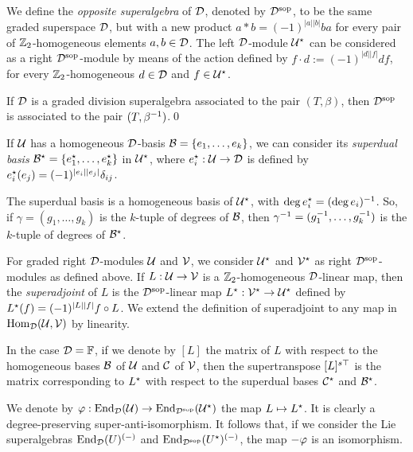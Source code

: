 \documentclass{amsbook}
\begin{document}
We define the \emph{opposite superalgebra} of $\mathcal{D}$, denoted by $\mathcal{D}^{\mathrm{sop}}$, to be the same graded superspace $\mathcal{D}$, but with a new product $a*b = (-1)^{|a||b|} ba$ for every pair of $\mathbb{Z}_2$-homogeneous elements $a,b \in \mathcal{D}$. The left $\mathcal{D}$-module $\mathcal U^\star$ can be considered as a right $\mathcal{D}^{\mathrm{sop}}$-module by means of the action defined by $f\cdot d := (-1)^{|d||f|} df$, for every $\mathbb{Z}_2$-homogeneous $d\in \mathcal{D}$ and $f\in \mathcal U^\star$.

\begin{lemma}\label{lemma:Dsop}
	If $\mathcal{D}$ is a graded division superalgebra associated to the pair $(T,\beta)$, then $\mathcal{D}^{\mathrm{sop}}$ is associated to the pair $(T,\beta^{-1})$.\qed
\end{lemma}

If $\mathcal U$ has a homogeneous $\mathcal{D}$-basis $\mathcal B = \{e_1, \ldots, e_k\}$, we can consider its \emph{superdual basis} $\mathcal B^\star = \{e_1^\star, \ldots, e_k^\star\}$ in $\mathcal U^\star$, where $e_i^\star : \mathcal U \rightarrow \mathcal{D}$ is defined by $e_i^\star (e_j) = (-1)^{|e_i||e_j|} \delta_{ij}$.

\begin{remark}\label{rmk:gamma-inv}
	The superdual basis is a homogeneous basis of $\mathcal U^\star$, with $\deg e_i^\star = (\deg e_i)^{-1}$. So, if $\gamma = (g_1, \ldots, g_k)$ is the $k$-tuple of degrees of $\mathcal B$, then $\gamma^{-1} = (g_1^{-1}, \ldots, g_k^{-1})$ is the $k$-tuple of degrees of $\mathcal B^\star$.
\end{remark}

For graded right $\mathcal{D}$-modules $\mathcal U$ and $\mathcal V$, we consider $\mathcal U^\star$ and $\mathcal V^\star$ as right $\mathcal{D}^{\mathrm{sop}}$-modules as defined above. If $L:\mathcal U \rightarrow \mathcal V$ is a $\mathbb{Z}_2$-homogeneous $\mathcal{D}$-linear map, then the \emph{superadjoint} of $L$ is the $\mathcal{D}^{\mathrm{sop}}$-linear map $L^\star: \mathcal V^\star \rightarrow \mathcal U^\star$ defined by $L^\star (f) = (-1)^{|L||f|} f \circ L$. We extend the definition of superadjoint to any map in $\operatorname{Hom}_{\mathcal{D}} (\mathcal U, \mathcal V)$ by linearity.

\begin{remark}
	In the case $\mathcal{D}=\mathbb{F}$, if we denote by $[L]$ the matrix of $L$ with respect to the homogeneous bases $\mathcal B$ of $\mathcal U$ and $\mathcal C$ of $\mathcal V$, then the supertranspose $[L]^{s\top}$ is the matrix corresponding to $L^\star$ with respect to the superdual bases $\mathcal C^\star$ and $\mathcal B^\star$.
\end{remark}

We denote by $\varphi: \operatorname{End}_{\mathcal{D}} (\mathcal U) \rightarrow \operatorname{End}_{\mathcal{D}^{\mathrm{sop}}} (\mathcal U^\star)$ the map $L \mapsto L^\star$. It is clearly a degree-preserving super-anti-isomorphism. It follows that, if we consider the Lie superalgebras $\operatorname{End}_{\mathcal{D}} (U)^{(-)}$ and $\operatorname{End}_{\mathcal{D}^{\mathrm{sop}}} (U^\star)^{(-)}$, the map $-\varphi$ is an isomorphism.
\end{document}
